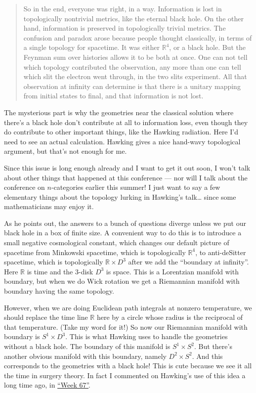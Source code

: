 \documentclass{article}
\begin{document}
\begin{quote}
So in the end, everyone was right, in a way. Information is lost in
topologically nontrivial metrics, like the eternal black hole. On the
other hand, information is preserved in topologically trivial metrics.
The confusion and paradox arose because people thought classically, in
terms of a single topology for spacetime. It was either
\(\mathbb{R}^4\), or a black hole. But the Feynman sum over histories
allows it to be both at once. One can not tell which topology
contributed the observation, any more than one can tell which slit the
electron went through, in the two slits experiment. All that observation
at infinity can determine is that there is a unitary mapping from
initial states to final, and that information is not lost.
\end{quote}

The mysterious part is why the geometries near the classical solution
where there's a black hole don't contribute at all to information loss,
even though they do contribute to other important things, like the
Hawking radiation. Here I'd need to see an actual calculation. Hawking
gives a nice hand-wavy topological argument, but that's not enough for
me.

Since this issue is long enough already and I want to get it out soon, I
won't talk about other things that happened at this conference --- nor
will I talk about the conference on \(n\)-categories earlier this
summer! I just want to say a few elementary things about the topology
lurking in Hawking's talk\ldots{} since some mathematicians may enjoy
it.

As he points out, the answers to a bunch of questions diverge unless we
put our black hole in a box of finite size. A convenient way to do this
is to introduce a small negative cosmological constant, which changes
our default picture of spacetime from Minkowski spacetime, which is
topologically \(\mathbb{R}^4\), to anti-deSitter spacetime, which is
topologically \(\mathbb{R}\times D^3\) after we add the ``boundary at
infinity''. Here \(\mathbb{R}\) is time and the \(3\)-disk \(D^3\) is
space. This is a Lorentzian manifold with boundary, but when we do Wick
rotation we get a Riemannian manifold with boundary having the same
topology.

However, when we are doing Euclidean path integrals at nonzero
temperature, we should replace the time line \(\mathbb{R}\) here by a
circle whose radius is the reciprocal of that temperature. (Take my word
for it!) So now our Riemannian manifold with boundary is
\(S^1 \times D^3\). This is what Hawking uses to handle the geometries
without a black hole. The boundary of this manifold is
\(S^1 \times S^2\). But there's another obvious manifold with this
boundary, namely \(D^2 \times S^2\). And this corresponds to the
geometries with a black hole! This is cute because we see it all the
time in surgery theory. In fact I commented on Hawking's use of this
idea a long time ago, in \protect\hyperlink{week67}{``Week 67''}.
\end{document}

